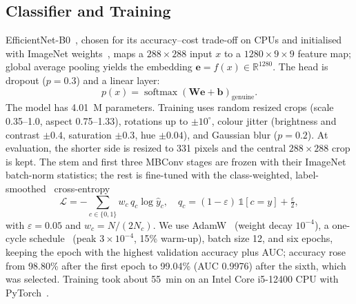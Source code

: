 \documentclass[journal,onecolumn]{IEEEtran}
\begin{document}
\subsection{Classifier and Training}
\label{sec:training}
EfficientNet-B0~\cite{tan2019efficientnet}, chosen for its accuracy--cost trade-off on
CPUs and initialised with ImageNet weights~\cite{deng2009imagenet}, maps a $288\times288$ input $x$ to a
$1280\times9\times9$ feature map; global average pooling yields the embedding
$\mathbf{e}=f(x)\in\mathbb{R}^{1280}$. The head is dropout ($p=0.3$) and a linear layer:
\begin{equation}
p(x) = \operatorname{softmax}\!\left(\mathbf{W}\mathbf{e}+\mathbf{b}\right)_{\text{genuine}} .
\label{eq:prob}
\end{equation}
The model has 4.01~M parameters. Training uses random resized crops (scale 0.35--1.0,
aspect 0.75--1.33), rotations up to $\pm10^\circ$, colour jitter (brightness and contrast
$\pm0.4$, saturation $\pm0.3$, hue $\pm0.04$), and Gaussian blur ($p=0.2$). At
evaluation, the shorter side is resized to 331 pixels and the central $288\times288$
crop is kept. The stem and first three MBConv stages are frozen with their ImageNet
batch-norm statistics; the rest is fine-tuned with the class-weighted,
label-smoothed~\cite{szegedy2016inception} cross-entropy
\begin{equation}
\mathcal{L} = -\sum_{c\in\{0,1\}} w_c\, q_c \log \hat{y}_c, \quad
q_c = (1-\varepsilon)\,\mathbb{1}[c=y] + \tfrac{\varepsilon}{2},
\label{eq:loss}
\end{equation}
with $\varepsilon=0.05$ and $w_c=N/(2N_c)$. We use AdamW~\cite{loshchilov2019adamw}
(weight decay $10^{-4}$), a one-cycle schedule~\cite{smith2019superconvergence} (peak
$3\times10^{-4}$, 15\% warm-up), batch size 12, and six epochs, keeping the epoch with
the highest validation accuracy plus AUC; accuracy rose from 98.80\% after the first
epoch to 99.04\% (AUC 0.9976) after the sixth, which was selected. Training took
about 55~min on an Intel Core i5-12400 CPU with PyTorch~\cite{paszke2019pytorch}.
\end{document}
